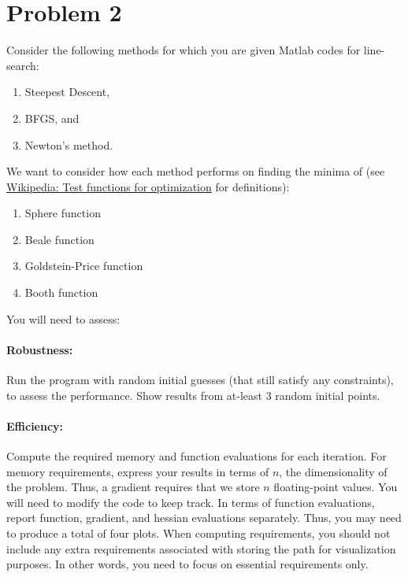 \documentclass[11pt]{article}
\begin{document}
	\newpage
	
	\section*{Problem 2}
	
	Consider the following methods for which you are given Matlab codes for line-search:
	\begin{enumerate}
		\item Steepest Descent,
		\item BFGS, and
		\item Newton’s method.
	\end{enumerate}
	
	We want to consider how each method performs on finding the minima of (see \href{https://en.wikipedia.org/wiki/Test_functions_for_optimization}{Wikipedia: Test functions for optimization} for definitions):
	\begin{enumerate}
		\item Sphere function
		\item Beale function
		\item Goldstein-Price function
		\item Booth function
	\end{enumerate}
	
	You will need to assess:
	
	\paragraph{Robustness:} Run the program with random initial guesses (that still satisfy any constraints), to assess the performance. Show results from at-least 3 random initial points.
	
	\paragraph{Efficiency:} Compute the required memory and function evaluations for each iteration. For memory requirements, express your results in terms of $n$, the dimensionality of the problem. Thus, a gradient requires that we store $n$ floating-point values. You will need to modify the code to keep track. In terms of function evaluations, report function, gradient, and hessian evaluations separately. Thus, you may need to produce a total of four plots. When computing requirements, you should not include any extra requirements associated with storing the path for visualization purposes. In other words, you need to focus on essential requirements only.
	
\end{document}
